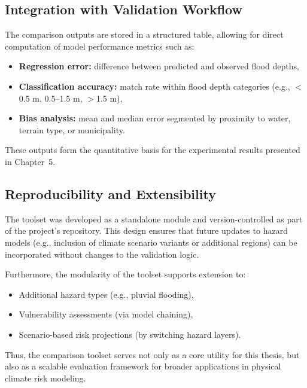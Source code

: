 \subsection{Integration with Validation Workflow}

The comparison outputs are stored in a structured table, allowing for direct computation of model performance metrics such as:
\begin{itemize}
    \item \textbf{Regression error:} difference between predicted and observed flood depths,
    \item \textbf{Classification accuracy:} match rate within flood depth categories (e.g., $<$0.5 m, 0.5–1.5 m, $>$1.5 m),
    \item \textbf{Bias analysis:} mean and median error segmented by proximity to water, terrain type, or municipality.
\end{itemize}

These outputs form the quantitative basis for the experimental results presented in Chapter~5.

\subsection{Reproducibility and Extensibility}

The toolset was developed as a standalone module and version-controlled as part of the project’s repository. This design ensures that future updates to hazard models (e.g., inclusion of climate scenario variants or additional regions) can be incorporated without changes to the validation logic.

Furthermore, the modularity of the toolset supports extension to:
\begin{itemize}
    \item Additional hazard types (e.g., pluvial flooding),
    \item Vulnerability assessments (via model chaining),
    \item Scenario-based risk projections (by switching hazard layers).
\end{itemize}

Thus, the comparison toolset serves not only as a core utility for this thesis, but also as a scalable evaluation framework for broader applications in physical climate risk modeling.
